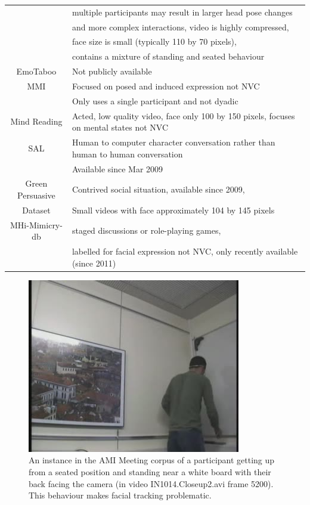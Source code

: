 \begin{table}
\begin{minipage}{0.99 \columnwidth}
\begin{tabular}{ | c | l |}
& multiple participants may result in larger head pose changes \\
& and more complex interactions, video is highly compressed, \\
& face size is small (typically 110 by 70 pixels), \\
& contains a mixture of standing and seated behaviour \\
\hline
EmoTaboo \cite{Zara2007}& Not publicly available \\
\hline
MMI \cite{Valstar2010}& Focused on posed and induced expression not \ac{NVC} \\
& Only uses a single participant and not dyadic\\
\hline
Mind Reading& Acted, low quality video, face only 100 by 150 pixels, focuses on mental states not \ac{NVC} \\
\hline
SAL \cite{Schroder2011}& Human to computer character conversation rather than human to human conversation \\
& Available since Mar 2009 \\
\hline
Green Persuasive& Contrived social situation, available since 2009, \\
Dataset & Small videos with face approximately 104 by 145 pixels\\
\hline
MHi-Mimicry-db\cite{Sun2011} & staged discussions or role-playing games, \\
& labelled for facial expression not \ac{NVC}, only recently available (since 2011)\\
\hline
\end{tabular}
\end{minipage}
\normalsize
\label{TableDatasetSuitability}
\end{table}

\begin{figure}
\centering
\includegraphics[width = 0.50 \columnwidth]{corpus/amimeeting-standing.jpg}

\caption[A participant getting up from a seated position in the AMI Meeting corpus]{An instance in the AMI Meeting corpus of a participant getting up from a seated position and standing near a white board with their back facing the camera (in video IN1014.Closeup2.avi frame 5200). This behaviour makes facial tracking problematic.}
\label{FigureAmiMeetingStanding}
\end{figure}

